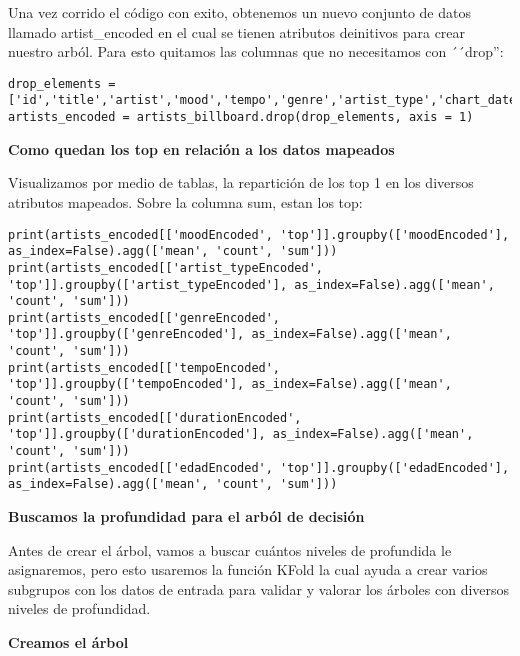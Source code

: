 \documentclass{article}
\begin{document}
Una vez corrido el código con exito, obtenemos un nuevo conjunto de datos llamado artist\_encoded en el cual se tienen atributos deinitivos para crear nuestro arból. Para esto quitamos las columnas que no necesitamos con ´´drop'': 
\begin{lstlisting}
drop_elements = ['id','title','artist','mood','tempo','genre','artist_type','chart_date','anioNacimiento','durationSeg','edad_en_billboard']
artists_encoded = artists_billboard.drop(drop_elements, axis = 1)
\end{lstlisting}






\textbf{Como quedan los top en relación a los datos mapeados}

Visualizamos por medio de tablas, la repartición de los top 1 en los diversos atributos mapeados. Sobre la columna sum, estan los top:
\begin{lstlisting}
print(artists_encoded[['moodEncoded', 'top']].groupby(['moodEncoded'], as_index=False).agg(['mean', 'count', 'sum']))
print(artists_encoded[['artist_typeEncoded', 'top']].groupby(['artist_typeEncoded'], as_index=False).agg(['mean', 'count', 'sum']))
print(artists_encoded[['genreEncoded', 'top']].groupby(['genreEncoded'], as_index=False).agg(['mean', 'count', 'sum']))
print(artists_encoded[['tempoEncoded', 'top']].groupby(['tempoEncoded'], as_index=False).agg(['mean', 'count', 'sum']))
print(artists_encoded[['durationEncoded', 'top']].groupby(['durationEncoded'], as_index=False).agg(['mean', 'count', 'sum']))
print(artists_encoded[['edadEncoded', 'top']].groupby(['edadEncoded'], as_index=False).agg(['mean', 'count', 'sum']))

\end{lstlisting}




\textbf{Buscamos la profundidad para el arból de decisión}




Antes de crear el árbol, vamos a buscar cuántos niveles de profundida le asignaremos, pero esto usaremos la función KFold la cual ayuda a crear varios subgrupos con los datos de entrada para validar y valorar los árboles con diversos niveles de profundidad.








\textbf{Creamos el árbol}
\end{document}
